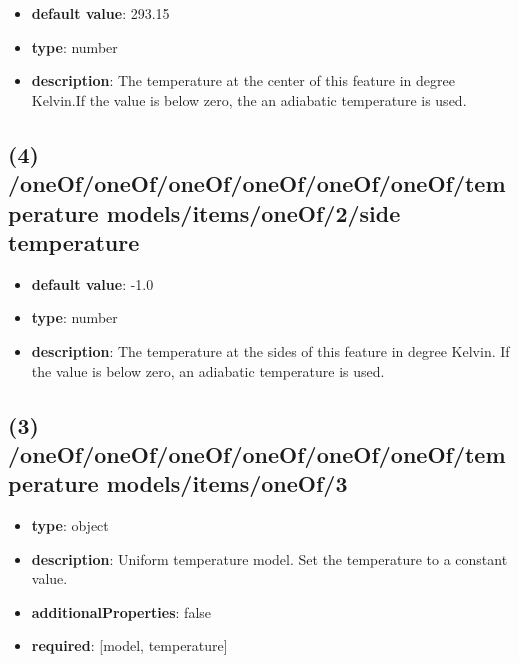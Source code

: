 \begin{itemize}[leftmargin=4em]\item {\bf default value}: 293.15
\item {\bf type}: number
\item {\bf description}: The temperature at the center of this feature in degree Kelvin.If the value is below zero, the an adiabatic temperature is used.
\end{itemize}\subsection{(4) /oneOf/oneOf/oneOf/oneOf/oneOf/oneOf/temperature models/items/oneOf/2/side temperature}
\begin{itemize}[leftmargin=4em]\item {\bf default value}: -1.0
\item {\bf type}: number
\item {\bf description}: The temperature at the sides of this feature in degree Kelvin. If the value is below zero, an adiabatic temperature is used.
\end{itemize}\subsection{(3) /oneOf/oneOf/oneOf/oneOf/oneOf/oneOf/temperature models/items/oneOf/3}
\begin{itemize}[leftmargin=3em]\item {\bf type}: object
\item {\bf description}: Uniform temperature model. Set the temperature to a constant value.
\item {\bf additionalProperties}: false
\item {\bf required}: [model, temperature]\end{itemize}
